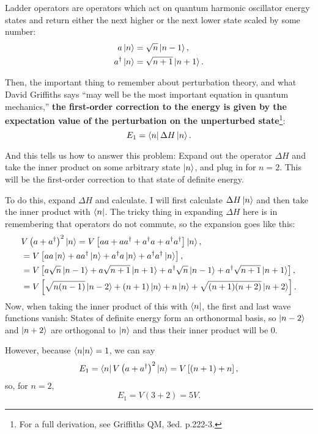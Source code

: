 \documentclass[11pt]{paper}
\begin{document}
Ladder operators are operators which act on quantum harmonic oscillator energy states and return either the next higher or the next lower state scaled by some number:
\begin{align}
	a\ket{n} &= \sqrt{n}\ket{n-1},\\
	a^\dagger\ket{n} &= \sqrt{n+1}\ket{n+1}.
\end{align}

Then, the important thing to remember about perturbation theory, and what David Griffiths says ``may well be the most important equation in quantum mechanics,'' \textbf{the first-order correction to the energy is given by the expectation value of the perturbation on the unperturbed state}\footnote{For a full derivation, see Griffiths QM, 3ed. p.222-3.}:
\begin{equation}
	E_1 = \bra{n}\Delta H\ket{n}.
\end{equation}

And this tells us how to answer this problem: Expand out the operator $\Delta H$ and take the inner product on some arbitrary state $\ket{n}$, and plug in for $n=2$.  This will be the first-order correction to that state of definite energy.

To do this, expand $\Delta H$ and calculate.  I will first calculate $\Delta H\ket{n}$ and then take the inner product with $\bra{n}$.  The tricky thing in expanding $\Delta H$ here is in remembering that operators do not commute, so the expansion goes like this:
\begin{align}
	&V\left(a+a^\dagger\right)^2\ket{n} = V\left[aa + aa^\dagger + a^\dagger a + a^\dagger a^\dagger\right]\ket{n},\\
	&= V\left[aa\ket{n} + aa^\dagger\ket{n} + a^\dagger a\ket{n} + a^\dagger a^\dagger\ket{n}\right],\\
	&= V\left[a\sqrt{n}\ket{n-1} + a\sqrt{n+1}\ket{n+1} + a^\dagger \sqrt{n}\ket{n-1} + a^\dagger \sqrt{n+1}\ket{n+1}\right],\\
	&=V\left[\sqrt{n(n-1)}\ket{n-2} + (n+1)\ket{n} + n\ket{n} + \sqrt{(n+1)(n+2)}\ket{n+2}\right].
\end{align}
Now, when taking the inner product of this with $\bra{n}$, the first and last wave functions vanish:  States of definite energy form an orthonormal basis, so $\ket{n-2}$ and $\ket{n+2}$ are orthogonal to $\ket{n}$ and thus their inner product will be 0.

However, because $\bra{n}\ket{n}=1$, we can say
\begin{equation}
	E_1 = \bra{n}V\left(a+a^\dagger\right)^2\ket{n} = V\left[(n+1) + n\right],
\end{equation}
so, for $n=2$,
\begin{equation}
	E_1 = V(3+2) = 5V.
\end{equation}
\end{document}

